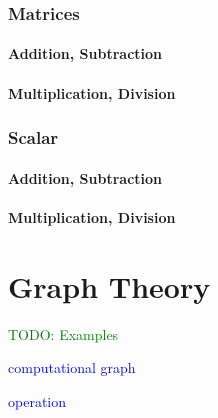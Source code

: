 \subsubsection{Matrices}

\paragraph{Addition, Subtraction}

\paragraph{Multiplication, Division}

\subsubsection{Scalar}

\paragraph{Addition, Subtraction}

\paragraph{Multiplication, Division}



\section{Graph Theory}

\textcolor{green}{TODO: Examples}

\textcolor{blue}{computational graph}

\textcolor{blue}{operation}

